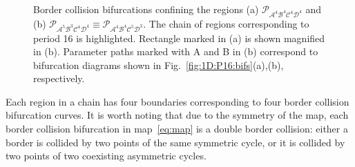 \documentclass[10pt]{article}
\newif\ifFigs       \Figsfalse
\renewcommand{\P}{{\mathcal P}}
\newcommand{\A}{{\mathcal A}}
\newcommand{\B}{{\mathcal B}}
\newcommand{\C}{{\mathcal C}}
\newcommand{\D}{{\mathcal D}}
\newcommand{\Includegraphics}[2]%
           {\centering
             \ifFigs\texttt{[image: \#2]}%
             \else  \texttt{[image: \#2]}\fi}
\newcommand{\Includesubgraphics}[3]%
{\begin{minipage}[b]{#1}
    \Includegraphics{\textwidth}{#2}\\
    \centerline{{\footnotesize (#3)}}
  \end{minipage}
}
\begin{document}

\begin{figure}[t]
	\caption{\label{fig:2D:blowup:bifs}Border collision bifurcations
		confining the regions (a) $\P_{\A^4\B^4\C^4\D^4}$ and (b)
		$\P_{\A^5\B^3\C^4\D^4}\equiv\P_{\A^4\B^4\C^5\D^3}$. The chain of
		regions corresponding to period 16 is highlighted. Rectangle
		marked in (a) is shown magnified in (b). Parameter paths marked
		with A and B in (b) correspond to bifurcation diagrams shown in
		Fig.~\ref{fig:1D:P16:bifs}(a),(b), respectively.}
\end{figure}


Each region in a chain has four boundaries corresponding to four
border collision bifurcation curves. It is worth noting that due to
the symmetry of the map, each border collision bifurcation in
map~\eqref{eq:map} is a double border collision: either a border is
collided by two points of the same symmetric cycle, or it is collided
by two points of two coexisting asymmetric cycles.
\end{document}
